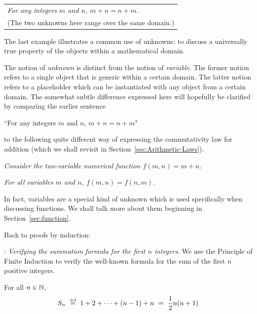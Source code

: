 \smallskip

\hspace*{.1in}\begin{tabular}{l}
{\em For any integers $m$ and $n$, $m + n = n + m$.} \\
(The two unknowns here range over the same domain.)
\end{tabular}

\medskip

The last example illustrates a common use of unknowns: to discuss a universally true property of the objects within a mathematical domain.

\bigskip

The notion of {\it unknown} is distinct from the notion of {\it variable}.  The former notion refers to a single object that is generic within a certain domain.  The latter notion refers to a placeholder which can be instantiated with any object from a certain domain.  The somewhat subtle difference expressed here will hopefully be clarified by comparing the earlier sentence

\smallskip

``For any integers $m$ and $n$, $m + n = n + m$"

\smallskip

\noindent
to the following quite different way of expressing the commutativity law for addition (which we shall revisit in Section~\ref{sec:Arithmetic-Laws}).

\smallskip

{\em Consider the two-variable numerical function $f(m, n) = m+n$.}

{\em  For all variables $m$ and $n$, $f(m,n) = f(n,m)$.}

\smallskip

In fact, variables are a special kind of unknown which is used specifically when discussing functions.  We shall talk more about them beginning in Section~\ref{sec:function}.

\bigskip

\noindent
Back to proofs by induction:

\bigskip

:  {\it Verifying the summation formula for the first $n$ integers}.
We use the Principle of Finite Induction to verify the well-known formula for the sum of the first $n$ positive integers.

 
\begin{prop}
\label{thm:sum-1-to-n-induction1}
For all $n \in \mathbb{N}$,
\begin{equation}
\label{eq:sum-first-n1}
S_n \ \stackrel{\mbox{{\tiny def}}}{=} \ 1 + 2 + \cdots + (n-1) + n
        \ = \ {1 \over 2} n (n+1)
\end{equation}
\end{prop}

